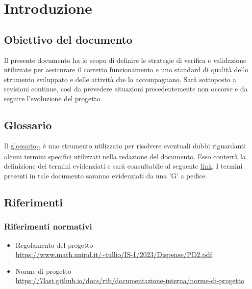 \section{Introduzione}
\subsection{Obiettivo del documento}
Il presente documento ha lo scopo di definire le strategie di verifica e validazione utilizzate per assicurare il corretto funzionamento e uno standard di qualità dello strumento sviluppato e delle
attività che lo accompagnano.  Sarà sottoposto a revisioni continue, così da prevedere situazioni precedentemente non occorse e da seguire l'evoluzione del progetto.

\subsection{Glossario}
Il \href{https://7last.github.io/docs/rtb/documentazione-interna/glossario\#glossario}{glossario\textsubscript{G}} è uno strumento utilizzato per risolvere eventuali dubbi riguardanti
alcuni termini specifici utilizzati nella redazione del documento.
Esso conterrà la definizione dei termini evidenziati e sarà consultabile al seguente \underline{\href{https://7last.github.io/docs/rtb/documentazione-interna/glossario}{link}}. I termini presenti in tale documento saranno evidenziati da una 'G' a pedice.

\subsection{Riferimenti}
\subsubsection{Riferimenti normativi}
\begin{itemize}
    \item Regolamento del progetto \\
        \url{https://www.math.unipd.it/~tullio/IS-1/2023/Dispense/PD2.pdf}.
    \item Norme di progetto \\
        \url{https://7last.github.io/docs/rtb/documentazione-interna/norme-di-progetto}
\end{itemize}
